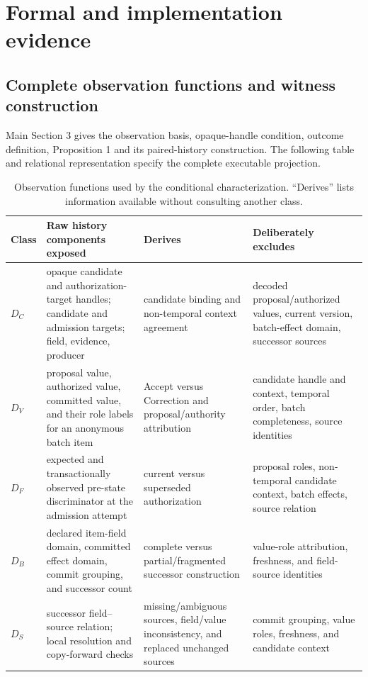 \documentclass[11pt,a4paper]{article}
\begin{document}
\section{Formal and implementation evidence}
\label{app:formal-details}

\subsection{Complete observation functions and witness construction}

Main Section 3 gives the observation basis, opaque-handle condition, outcome definition, Proposition 1 and its paired-history construction. The following table and relational representation specify the complete executable projection.
\begin{table}[t]
\centering
\footnotesize
\caption{Observation functions used by the conditional characterization. ``Derives'' lists information available without consulting another class.}
\label{tab:observation-functions}
\begin{tabularx}{\textwidth}{@{}l>{\raggedright\arraybackslash}p{}>{\raggedright\arraybackslash}p{}>{\raggedright\arraybackslash}X@{}}
\toprule
Class & Raw history components exposed & Derives & Deliberately excludes \\
\midrule
$D_C$ & opaque candidate and authorization-target handles; candidate and admission targets; field, evidence, producer & candidate binding and non-temporal context agreement & decoded proposal/authorized values, current version, batch-effect domain, successor sources \\
$D_V$ & proposal value, authorized value, committed value, and their role labels for an anonymous batch item & Accept versus Correction and proposal/authority attribution & candidate handle and context, temporal order, batch completeness, source identities \\
$D_F$ & expected and transactionally observed pre-state discriminator at the admission attempt & current versus superseded authorization & proposal roles, non-temporal candidate context, batch effects, source relation \\
$D_B$ & declared item-field domain, committed effect domain, commit grouping, and successor count & complete versus partial/fragmented successor construction & value-role attribution, freshness, and field-source identities \\
$D_S$ & successor field--source relation; local resolution and copy-forward checks & missing/ambiguous sources, field/value inconsistency, and replaced unchanged sources & commit grouping, value roles, freshness, and candidate context \\
\bottomrule
\end{tabularx}
\end{table}
\end{document}
